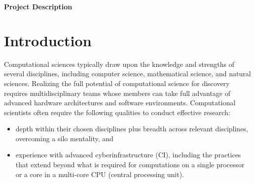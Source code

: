 \documentclass[11pt]{NSFamsart}
\begin{document}


\centerline{\Large \textbf{Project Description}}
\vspace{-2ex}

\setcounter{tocdepth}{2}
\tableofcontents %

\vspace{-6ex}

\section{Introduction}
Computational sciences typically draw upon the knowledge and strengths of several disciplines, including computer science, mathematical science, and natural sciences.  Realizing the full potential of computational science for discovery requires multidisciplinary teams whose members can take full advantage of advanced hardware architectures and software environments.  Computational scientists often require the following qualities to conduct effective research:

\begin{itemize}
\item depth within their chosen disciplines plus breadth across relevant disciplines, overcoming a silo mentality, and
\item experience with advanced cyberinfrastructure (CI), including the practices that extend beyond what is required for computations on a single processor or a core  in a multi-core CPU (central processing unit).
\end{itemize}
\end{document}
